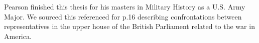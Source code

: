 
Pearson finished this thesis for his masters in Military History as a U.S. Army
Major. We sourced this referenced for p.16 describing confrontations between 
representatives in the upper house of the British Parliament related to the war
in America.
